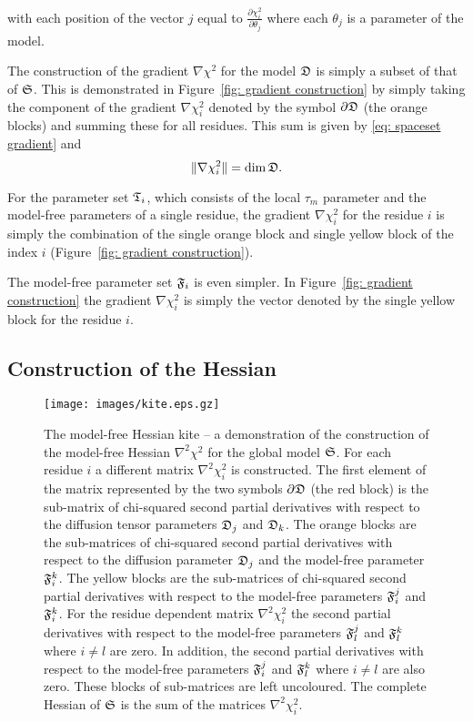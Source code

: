 \noindent with each position of the vector $j$ equal to $\frac{\partial \chi^2_i}{\partial \theta_j}$ where each $\theta_j$ is a parameter of the model.

The construction of the gradient $\nabla \chi^2$ for the model $\mathfrak{D}$ is simply a subset of that of $\mathfrak{S}$.  This is demonstrated in Figure~\ref{fig: gradient construction} by simply taking the component of the gradient $\nabla \chi^2_i$ denoted by the symbol $\partial \mathfrak{D}$ (the orange blocks) and summing these for all residues.  This sum is given by \eqref{eq: spaceset gradient} and
\begin{equation}
    \lVert \nabla \chi^2_i \rVert = \dim \mathfrak{D}.
\end{equation}

For the parameter set $\mathfrak{T}_i$, which consists of the local $\tau_m$ parameter and the model-free parameters of a single residue, the gradient $\nabla \chi^2_i$ for the residue $i$ is simply the combination of the single orange block and single yellow block of the index $i$ (Figure~\ref{fig: gradient construction}).

The model-free parameter set $\mathfrak{F}_i$ is even simpler.  In Figure~\ref{fig: gradient construction} the gradient $\nabla \chi^2_i$ is simply the vector denoted by the single yellow block for the residue $i$.




\subsection{Construction of the Hessian}

\begin{figure}
\centerline{\texttt{[image: images/kite.eps.gz]}}
\caption[The model-free Hessian kite.]{The model-free Hessian kite -- a demonstration of the construction of the model-free Hessian $\nabla^2 \chi^2$ for the global model $\mathfrak{S}$.  For each residue $i$ a different matrix $\nabla^2 \chi^2_i$ is constructed.  The first element of the matrix represented by the two symbols $\partial \mathfrak{D}$ (the red block) is the sub-matrix of chi-squared second partial derivatives with respect to the diffusion tensor parameters $\mathfrak{D}_j$ and $\mathfrak{D}_k$.  The orange blocks are the sub-matrices of chi-squared second partial derivatives with respect to the diffusion parameter $\mathfrak{D}_j$ and the model-free parameter $\mathfrak{F}_i^k$.  The yellow blocks are the sub-matrices of chi-squared second partial derivatives with respect to the model-free parameters $\mathfrak{F}_i^j$ and $\mathfrak{F}_i^k$.  For the residue dependent matrix $\nabla^2 \chi^2_i$ the second partial derivatives with respect to the model-free parameters $\mathfrak{F}_l^j$ and $\mathfrak{F}_l^k$ where $i \ne l$ are zero.  In addition, the second partial derivatives with respect to the model-free parameters $\mathfrak{F}_i^j$ and $\mathfrak{F}_l^k$ where $i \ne l$ are also zero.  These blocks of sub-matrices are left uncoloured.  The complete Hessian of $\mathfrak{S}$ is the sum of the matrices $\nabla^2 \chi^2_i$.}\label{fig: Hessian kite}
\end{figure}

